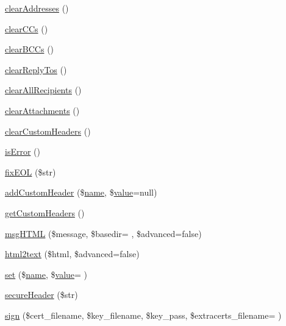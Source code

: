 \begin{DoxyCompactItemize}
\hyperlink{class_p_h_p_mailer_a5abf0feadd6b4ba311bd2fd71b4aaab1}{clear\+Addresses} ()
\item 
\hyperlink{class_p_h_p_mailer_a7dfe4733feb812ac7a777bdebed70e45}{clear\+C\+Cs} ()
\item 
\hyperlink{class_p_h_p_mailer_a1edca04216fc6a06c059a572a0875e90}{clear\+B\+C\+Cs} ()
\item 
\hyperlink{class_p_h_p_mailer_aeaf9d6ef74c9c823eb5f1fcbeeb396de}{clear\+Reply\+Tos} ()
\item 
\hyperlink{class_p_h_p_mailer_af106137a9abfdb4b9e44fca86f7a727e}{clear\+All\+Recipients} ()
\item 
\hyperlink{class_p_h_p_mailer_a2b4d4199414b58bc4db009cb17ad8e3b}{clear\+Attachments} ()
\item 
\hyperlink{class_p_h_p_mailer_adcdcf2709938f5ab0c6074172d73d5b7}{clear\+Custom\+Headers} ()
\item 
\hyperlink{class_p_h_p_mailer_a763bcf1f1b83418647c32053ed2988db}{is\+Error} ()
\item 
\hyperlink{class_p_h_p_mailer_a1b9ac8f8f734ebda9ca05c3313a42852}{fix\+E\+OL} (\$str)
\item 
\hyperlink{class_p_h_p_mailer_a58c011aa0d493a352c8d8d585a5e85d2}{add\+Custom\+Header} (\$\hyperlink{user_8php_a765af5e9671743530143a6d3670fd9a6}{name}, \$\hyperlink{fullpage_2plugin_8min_8js_ac56c57897e10f699d124e0103921aa20}{value}=null)
\item 
\hyperlink{class_p_h_p_mailer_a6dece3e0c6c39c2f1a80d8f62196f30a}{get\+Custom\+Headers} ()
\item 
\hyperlink{class_p_h_p_mailer_a6c569c4def38cb71b40f0634f17e8230}{msg\+H\+T\+ML} (\$message, \$basedir= \textquotesingle{}\textquotesingle{}, \$advanced=false)
\item 
\hyperlink{class_p_h_p_mailer_adcc957bbfc73453cc7f04e412603989d}{html2text} (\$html, \$advanced=false)
\item 
\hyperlink{class_p_h_p_mailer_a75ddddcb4fd8f092e42a3cf96c006066}{set} (\$\hyperlink{user_8php_a765af5e9671743530143a6d3670fd9a6}{name}, \$\hyperlink{fullpage_2plugin_8min_8js_ac56c57897e10f699d124e0103921aa20}{value}= \textquotesingle{}\textquotesingle{})
\item 
\hyperlink{class_p_h_p_mailer_a808495366277050ff38fa5bcfab8f49e}{secure\+Header} (\$str)
\item 
\hyperlink{class_p_h_p_mailer_abdc7683507bef51fdb7b4c1e4a7c70d2}{sign} (\$cert\+\_\+filename, \$key\+\_\+filename, \$key\+\_\+pass, \$extracerts\+\_\+filename= \textquotesingle{}\textquotesingle{})

\end{DoxyCompactItemize}
